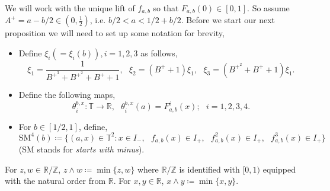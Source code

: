 \documentclass[12pt]{amsart}
\numberwithin{equation}{section}
\theoremstyle{remark}
\begin{document}
  We will work with the unique lift of $f_{a,b}$ so that $F_{a,b}(0) \in [0,1]$. So assume $A^+=a-b/2 \in (0,\tfrac{1}{2})$, i.e. $b/2<a<1/2+b/2$. Before we start our next proposition we will need to set up some notation for brevity,
 \begin{itemize}
    
    \item Define $\xi_i(=\xi_i(b)), i=1,2,3$ as follows,  \[
 \xi_1=\dfrac{1}{B^{+^{3}}+B^{+^{2}}+B^++1}, \text{ } \xi_2= (B^++1) \xi_1, \text{ }\xi_3=(B^{+^{2}}+B^++1)\xi_1.
 \]
    \item Define the following maps,
\[
\theta_{i}^{b,x}: \mathbb{T} \to \mathbb{R}, \text{ }\theta_{i}^{b,x}(a)=F_{a,b}^{i}(x); \text{ } i=1,2,3,4.
\]
    \item For $b\in [1/2,1]$, define, \[ \text{SM}^{4}(b) \coloneq \{ (a,x) \in \mathbb{T}^2 :x \in I_-, \text{ }f_{a,b}(x)\in I_+, \text{ } f_{a,b}^2(x)\in I_+, \text{ } f_{a,b}^3(x)\in I_+ \} \](SM stands for \textit{starts with minus}).
 \end{itemize}
 \vspace{.1cm}
 For $z,w \in \mathbb{R}/\mathbb{Z}$, $z \wedge w \coloneq \min\{z,w\}$ where $\mathbb{R}/\mathbb{Z}$ is identified with $[0,1)$ equipped with the natural order from $\mathbb{R}$. For $x,y \in \mathbb{R}$, $x \wedge y \coloneq \min\{x,y\}$.
\bigskip
\end{document}
